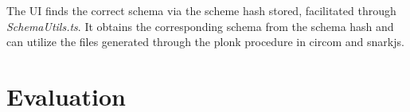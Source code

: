 The UI finds the correct schema via the scheme hash stored, facilitated through \textit{SchemaUtils.ts}. It obtains the corresponding schema from the schema hash and can utilize the files generated through the \acrshort{plonk} procedure in circom and snarkjs.

\section{Evaluation}

